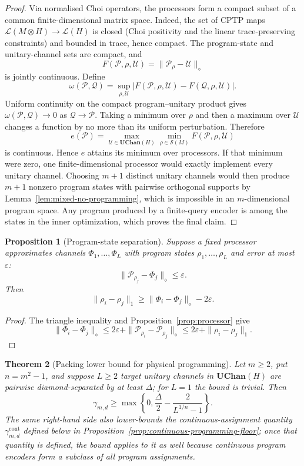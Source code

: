 \documentclass[11pt,a4paper]{article}
\theoremstyle{definition}
\theoremstyle{plain}
\newtheorem{theorem}{Theorem}[section]
\newtheorem{proposition}[theorem]{Proposition}
\theoremstyle{remark}
\newcommand{\Lin}{\mathcal L}
\newcommand{\UChan}{\mathbf{UChan}}
\newcommand{\Sstate}{\mathcal{S}}
\begin{document}
\begin{proof}
Via normalised Choi operators, the processors form a compact subset of a
common finite-dimensional matrix space. Indeed, the set of CPTP maps
$\Lin(M\otimes H)\to\Lin(H)$ is closed (Choi positivity and the linear
trace-preserving constraints) and bounded in trace, hence compact. The program-state and unitary-channel sets
are compact, and
\[
F(\mathcal P,\rho,\mathcal U)
=\|\mathcal P_\rho-\mathcal U\|_\diamond
\]
is jointly continuous. Define
\[
\omega(\mathcal P,\mathcal Q)
=\sup_{\rho,\mathcal U}
|F(\mathcal P,\rho,\mathcal U)-F(\mathcal Q,\rho,\mathcal U)|.
\]
Uniform continuity on the compact program--unitary product gives
$\omega(\mathcal P,\mathcal Q)\to0$ as $\mathcal Q\to\mathcal P$.
Taking a minimum over $\rho$ and then a maximum over $\mathcal U$ changes
a function by no more than its uniform perturbation. Therefore
\[
e(\mathcal P)
=\max_{\mathcal U\in\UChan(H)}
  \min_{\rho\in\Sstate(M)}F(\mathcal P,\rho,\mathcal U)
\]
is continuous. Hence $e$ attains its minimum over processors. If that
minimum were zero, one finite-dimensional processor would exactly implement
every unitary channel. Choosing $m+1$ distinct unitary channels would then
produce $m+1$ nonzero program states with pairwise orthogonal supports by
Lemma~\ref{lem:mixed-no-programming}, which is impossible in an
$m$-dimensional program space. Any program produced by a finite-query encoder is
among the states in the inner optimization, which proves the final claim.
\end{proof}

\begin{proposition}[Program-state separation]
\label{prop:program-separation}
Suppose a fixed processor approximates channels $\Phi_1,\ldots,\Phi_L$ with
program states $\rho_1,\ldots,\rho_L$ and error at most $\varepsilon$:
\[
\|\mathcal P_{\rho_j}-\Phi_j\|_\diamond\leq\varepsilon.
\]
Then
\[
\|\rho_i-\rho_j\|_1
\geq\|\Phi_i-\Phi_j\|_\diamond-2\varepsilon.
\]
\end{proposition}

\begin{proof}
The triangle inequality and Proposition~\ref{prop:processor} give
\[
\|\Phi_i-\Phi_j\|_\diamond
\leq2\varepsilon+
\|\mathcal P_{\rho_i}-\mathcal P_{\rho_j}\|_\diamond
\leq2\varepsilon+\|\rho_i-\rho_j\|_1.
\]
\end{proof}

\begin{theorem}[Packing lower bound for physical programming]
\label{thm:program-packing-rate}
Let $m\geq2$, put $n=m^2-1$, and suppose $L\geq2$ target unitary
channels in $\UChan(H)$ are pairwise diamond-separated by at least
$\Delta$; for $L=1$ the bound is trivial. Then
\[
\gamma_{m,d}
\geq
\max\left\{0,
\frac\Delta2-
\frac2{L^{1/n}-1}
\right\}.
\]
The same right-hand side also lower-bounds the continuous-assignment
quantity $\gamma^{\mathrm{cont}}_{m,d}$ defined below in
Proposition~\ref{prop:continuous-programming-floor}; once that quantity is defined, the bound applies to it as well because continuous program encoders form a subclass of all program assignments.
\end{theorem}
\end{document}
